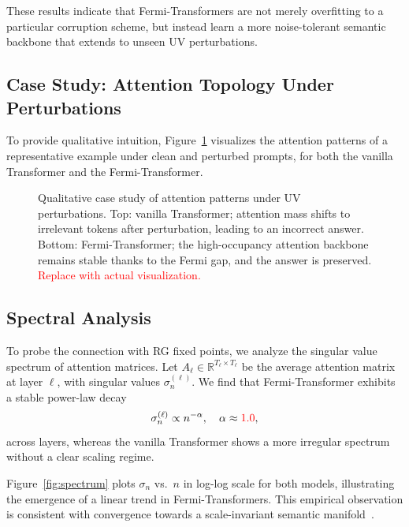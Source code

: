 \documentclass{article}
\newcommand{\TODO}[1]{\textcolor{red}{#1}}
\begin{document}
These results indicate that Fermi-Transformers are not merely overfitting to a particular corruption scheme, but instead learn a more noise-tolerant semantic backbone that extends to unseen UV perturbations.

\subsection{Case Study: Attention Topology Under Perturbations}

To provide qualitative intuition, Figure~\ref{fig:case_study} visualizes the attention patterns of a representative example under clean and perturbed prompts, for both the vanilla Transformer and the Fermi-Transformer.

\begin{figure}[t]
    \centering
    \fbox{%
        \begin{minipage}[c][0.35\linewidth][c]{0.9\linewidth}
            \centering
            \TODO{Case study attention heatmap placeholder}
        \end{minipage}
    }
    \caption{
    Qualitative case study of attention patterns under UV perturbations.
    Top: vanilla Transformer; attention mass shifts to irrelevant tokens after perturbation, leading to an incorrect answer.
    Bottom: Fermi-Transformer; the high-occupancy attention backbone remains stable thanks to the Fermi gap, and the answer is preserved.
    \TODO{Replace with actual visualization.}
    }
    \label{fig:case_study}
\end{figure}

\subsection{Spectral Analysis}

To probe the connection with RG fixed points, we analyze the singular value spectrum of attention matrices. Let $A_\ell \in \mathbb{R}^{T_\ell \times T_\ell}$ be the average attention matrix at layer $\ell$, with singular values $\sigma_{n}^{(\ell)}$. We find that Fermi-Transformer exhibits a stable power-law decay
\begin{equation}
    \sigma_{n}^{(\ell)} \propto n^{-\alpha}, \quad \alpha \approx \TODO{1.0},
\end{equation}
across layers, whereas the vanilla Transformer shows a more irregular spectrum without a clear scaling regime.

Figure~\ref{fig:spectrum} plots $\sigma_n$ vs.~$n$ in log-log scale for both models, illustrating the emergence of a linear trend in Fermi-Transformers. This empirical observation is consistent with convergence towards a scale-invariant semantic manifold~\cite{zimmern2024large, sethna2001crackling}.
\end{document}
